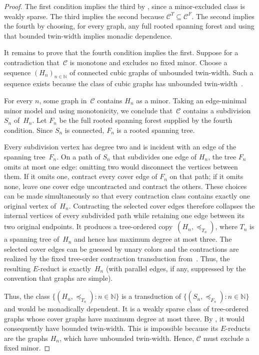\documentclass[1p,number,11pt]{elsarticle}
\theoremstyle{plain}
\newcommand{\Cc}{\mathscr{C}}
\begin{document}
\begin{proof}
The first condition implies the third by , since a minor-excluded class is weakly sparse.
The third implies the second because $\Cc^{\Upsilon}\subseteq\Cc^F$.
The second implies the fourth by choosing, for every graph, any full rooted spanning forest and using that bounded twin-width implies monadic dependence.

It remains to prove that the fourth condition implies the first.
Suppose for a contradiction that~$\Cc$ is monotone and excludes no fixed minor.
Choose a sequence $(H_n)_{n\in\mathbb N}$ of connected cubic graphs of unbounded twin-width.
Such a sequence exists because the class of cubic graphs has unbounded twin-width~\cite{bonnet2022twwII}.

For every $n$, some graph in~$\Cc$ contains $H_n$ as a minor.  Taking an
edge-minimal minor model and using monotonicity, we conclude that~$\Cc$
contains a subdivision $S_n$ of~$H_n$.  Let $F_n$ be the full rooted spanning
forest supplied by the fourth condition.  Since $S_n$ is connected, $F_n$ is
a rooted spanning tree.

Every subdivision vertex has degree two and is incident with an edge of the
spanning tree~$F_n$.  On a path of $S_n$ that subdivides one edge of $H_n$,
the tree $F_n$ omits at most one edge: omitting two would disconnect the
vertices between them.  If it omits one, contract every cover edge of $F_n$
on that path; if it omits none, leave one cover edge uncontracted and contract
the others.  These choices can be made simultaneously so that every
contraction class contains exactly one original vertex of~$H_n$.  Contracting
the selected cover edges therefore collapses the internal vertices of every
subdivided path while retaining one edge between its two original endpoints.
It produces a tree-ordered copy~$(H_n,\preceq_{T_n})$, where $T_n$ is a
spanning tree of~$H_n$ and hence has maximum degree at most three.  The
selected cover edges can be guessed by unary colors and the contractions are
realized by the fixed tree-order contraction transduction from~\cite{buffiere2026characterizations}.  Thus, the resulting
$E$-reduct is exactly~$H_n$ (with parallel edges, if any, suppressed by the
convention that graphs are simple).

Thus, the class $\{(H_n,\preceq_{T_n}):n\in\mathbb N\}$ is a transduction of
$\{(S_n,\preceq_{F_n}):n\in\mathbb N\}$ and would be monadically dependent.
It is a weakly sparse class of tree-ordered graphs whose cover graphs have
maximum degree at most three.  By
, it would consequently have bounded
twin-width.  This is impossible because its $E$-reducts are the graphs
$H_n$, which have unbounded twin-width.  Hence, $\Cc$ must exclude a fixed
minor.
\end{proof}
\end{document}
